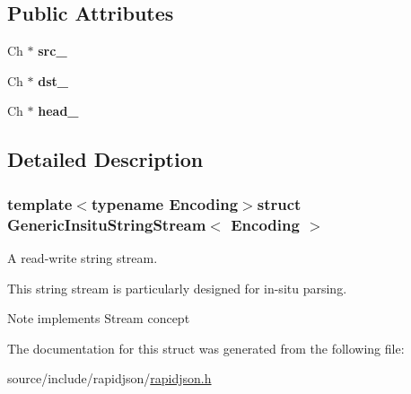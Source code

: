 \subsection*{Public Attributes}
\begin{DoxyCompactItemize}
\item 
\hypertarget{struct_generic_insitu_string_stream_af3cc551dd07fcca39db84459f4d4e718}{}Ch $\ast$ {\bfseries src\+\_\+}\label{struct_generic_insitu_string_stream_af3cc551dd07fcca39db84459f4d4e718}

\item 
\hypertarget{struct_generic_insitu_string_stream_ab0e7a73638a7a8db81aa9b26714b0e3b}{}Ch $\ast$ {\bfseries dst\+\_\+}\label{struct_generic_insitu_string_stream_ab0e7a73638a7a8db81aa9b26714b0e3b}

\item 
\hypertarget{struct_generic_insitu_string_stream_af5a7116bdd9bfde5141c298a5b7566b0}{}Ch $\ast$ {\bfseries head\+\_\+}\label{struct_generic_insitu_string_stream_af5a7116bdd9bfde5141c298a5b7566b0}

\end{DoxyCompactItemize}


\subsection{Detailed Description}
\subsubsection*{template$<$typename Encoding$>$struct Generic\+Insitu\+String\+Stream$<$ Encoding $>$}

A read-\/write string stream. 

This string stream is particularly designed for in-\/situ parsing. \begin{DoxyNote}{Note}
implements Stream concept 
\end{DoxyNote}


The documentation for this struct was generated from the following file\+:\begin{DoxyCompactItemize}
\item 
source/include/rapidjson/\hyperlink{rapidjson_8h}{rapidjson.\+h}\end{DoxyCompactItemize}

